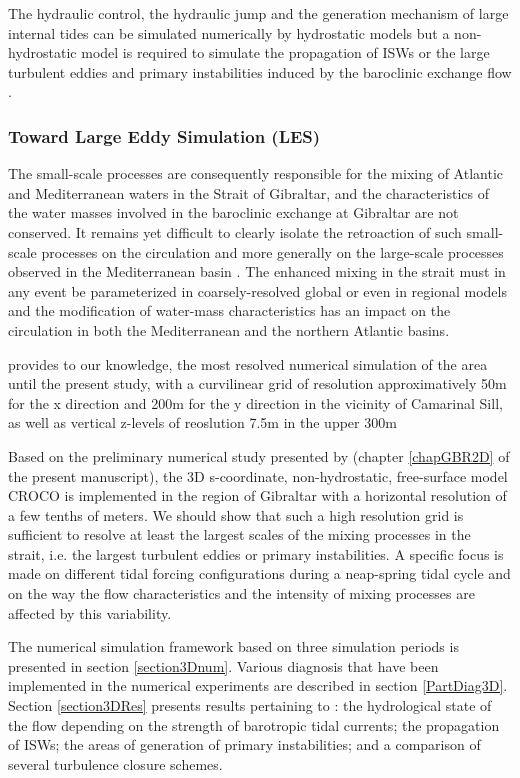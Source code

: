 The hydraulic control, the hydraulic jump and the generation mechanism of large internal tides can be simulated numerically by hydrostatic models but a non-hydrostatic model is required to simulate the propagation of ISWs or the large turbulent eddies and primary instabilities induced by the baroclinic exchange flow \citep{brandt_1996,vlasenko_2009}.

\subsubsection{Toward Large Eddy Simulation (LES)}

The small-scale processes are consequently responsible for the mixing of Atlantic and Mediterranean waters in the Strait of Gibraltar, and the characteristics of the water masses involved in the baroclinic exchange at Gibraltar are not conserved. It remains yet difficult to clearly isolate the retroaction of such small-scale processes on the circulation and more generally on the large-scale processes observed in the Mediterranean basin \citep{garcia-lafuente_2017}.
The enhanced mixing in the strait must in any event be parameterized in coarsely-resolved global or even in regional models and the modification of water-mass characteristics has an impact on the circulation in both the Mediterranean and the northern Atlantic basins. 

\citet{sanchez-garrido_2011} provides to our knowledge, the most resolved numerical simulation of the area until the present study, with a curvilinear grid of resolution approximatively 50m for the x direction and 200m for the y direction in the vicinity of Camarinal Sill, as well as vertical z-levels of reoslution 7.5m in the upper 300m

Based on the preliminary numerical study presented by \citet{hilt_2020} (chapter \ref{chapGBR2D} of the present manuscript), the 3D s-coordinate, non-hydrostatic, free-surface model CROCO is implemented in the region of Gibraltar with a horizontal resolution of a few tenths of meters. We should show that such a high resolution grid is sufficient to resolve at least the largest scales of the mixing processes in the strait, i.e. the largest turbulent eddies or primary instabilities. A specific focus is made on different tidal forcing configurations during a neap-spring tidal cycle and on the way the flow characteristics and the intensity of mixing processes are affected by this variability. 

The numerical simulation framework based on three simulation periods is presented in section \ref{section3Dnum}. Various diagnosis that have been implemented in the numerical experiments are described in section \ref{PartDiag3D}. Section \ref{section3DRes} presents results pertaining to : the hydrological state of the flow depending on the strength of barotropic tidal currents; the propagation of ISWs; the areas of generation of primary instabilities; and a comparison of several turbulence closure schemes.

